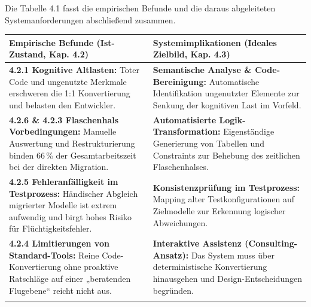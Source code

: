 Die Tabelle 4.1 fasst die empirischen Befunde und die daraus abgeleiteten Systemanforderungen abschließend zusammen.

\begin{table}[htbp]
    \centering
    \renewcommand{\arraystretch}{2}
    \label{tab:anforderungsmatrix_exakt}
    \begin{tabularx}{\textwidth}{@{} 
        >{\raggedright\arraybackslash}p{7cm} 
        >{\raggedright\arraybackslash}X @{}}
        \toprule
        \textbf{Empirische Befunde (Ist-Zustand, Kap. 4.2)} & \textbf{Systemimplikationen (Ideales Zielbild, Kap. 4.3)} \\
        \midrule
        
        \textbf{4.2.1 Kognitive Altlasten:} \newline
        Toter Code und ungenutzte Merkmale erschweren die 1:1 Konvertierung und belasten den Entwickler. & 
        \textbf{Semantische Analyse \& Code-Bereinigung:} \newline
        Automatische Identifikation ungenutzter Elemente zur Senkung der kognitiven Last im Vorfeld. \\
        \addlinespace
        
        \textbf{4.2.6 \& 4.2.3 Flaschenhals Vorbedingungen:} \newline
        Manuelle Auswertung und Restrukturierung binden 66\,\% der Gesamtarbeitszeit bei der direkten Migration. & 
        \textbf{Automatisierte Logik-Transformation:} \newline
        Eigenständige Generierung von Tabellen und Constraints zur Behebung des zeitlichen Flaschenhalses. \\
        \addlinespace
        
        \textbf{4.2.5 Fehleranfälligkeit im Testprozess:} \newline
        Händischer Abgleich migrierter Modelle ist extrem aufwendig und birgt hohes Risiko für Flüchtigkeitsfehler. & 
        \textbf{Konsistenzprüfung im Testprozess:} \newline
        Mapping alter Testkonfigurationen auf Zielmodelle zur Erkennung logischer Abweichungen. \\
        \addlinespace
        
        \textbf{4.2.4 Limitierungen von Standard-Tools:} \newline
        Reine Code-Konvertierung ohne proaktive Ratschläge auf einer „beratenden Flugebene“ reicht nicht aus. & 
        \textbf{Interaktive Assistenz (Consulting-Ansatz):} \newline
        Das System muss über deterministische Konvertierung hinausgehen und Design-Entscheidungen begründen. \\
        \addlinespace
        

\end{tabularx}
\end{table}
